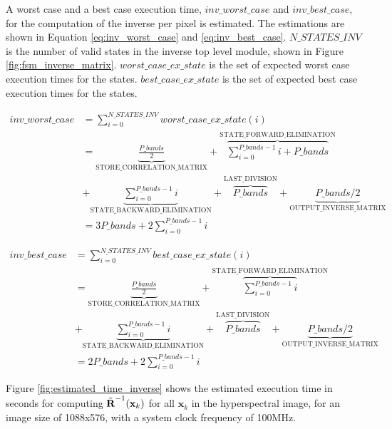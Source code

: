 A worst case and a best case execution time, $inv\_worst\_case$ and $inv\_best\_case$, for the computation of the inverse per pixel is estimated. The estimations are shown in Equation \ref{eq:inv_worst_case} and \ref{eq:inv_best_case}. $N\_STATES\_INV$ is the number of valid states in the inverse top level module, shown in Figure \ref{fig:fsm_inverse_matrix}. $worst\_case\_ex\_state$ is the set of expected worst case execution times for the states.  $best\_case\_ex\_state$ is the set of expected best case execution times for the states. 

\begin{equation}
\begin{split}
inv\_worst\_case & = \sum_{i=0}^{N\_STATES\_INV}worst\_case\_ex\_state(i) \\
& =\underbrace{\frac{P\_bands}{2} }_\text{STORE\_CORRELATION\_MATRIX}  + \overbrace{\sum_{i=0}^{P\_bands-1}i + P\_bands}^\text{STATE\_FORWARD\_ELIMINATION} \\
& + \underbrace{\sum_{i=0}^{P\_bands-1}i}_\text{STATE\_BACKWARD\_ELIMINATION}  
 +
\overbrace{P\_bands}^\text{LAST\_DIVISION} + \underbrace{P\_bands/2}_\text{OUTPUT\_INVERSE\_MATRIX}\\
& = 3P\_bands + 2\sum_{i=0}^{P\_bands-1}i
\end{split}
\label{eq:inv_worst_case}
\end{equation}


\begin{equation}
\begin{split}
inv\_best\_case & = \sum_{i=0}^{N\_STATES\_INV}best\_case\_ex\_state(i) \\
& = \underbrace{\frac{P\_bands}{2} }_\text{STORE\_CORRELATION\_MATRIX}  + \overbrace{\sum_{i=0}^{P\_bands-1}i }^\text{STATE\_FORWARD\_ELIMINATION} \\
& + \underbrace{\sum_{i=0}^{P\_bands-1}i}_\text{STATE\_BACKWARD\_ELIMINATION}  
 +
\overbrace{P\_bands}^\text{LAST\_DIVISION} + \underbrace{P\_bands/2}_\text{OUTPUT\_INVERSE\_MATRIX}\\
& = 2P\_bands + 2\sum_{i=0}^{P\_bands-1}i
\end{split}
\label{eq:inv_best_case}
\end{equation}

Figure \ref{fig:estimated_time_inverse} shows the estimated execution time in seconds for computing $\Tilde{\textbf{R}}^{-1}(\textbf{x}_k)$ for all $\textbf{x}_k$ in the hyperspectral image, for an image size of 1088x576, with a system clock frequency of 100MHz. 

